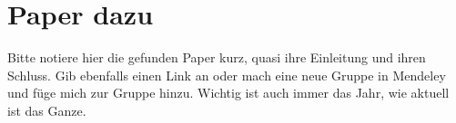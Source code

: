 
\chapter{Paper dazu\label{ch:intro}}

Bitte notiere hier die gefunden Paper kurz, quasi ihre Einleitung und ihren Schluss. Gib ebenfalls einen Link an oder mach eine neue Gruppe in Mendeley und füge mich zur Gruppe hinzu. Wichtig ist auch immer das Jahr, wie aktuell ist das Ganze.
